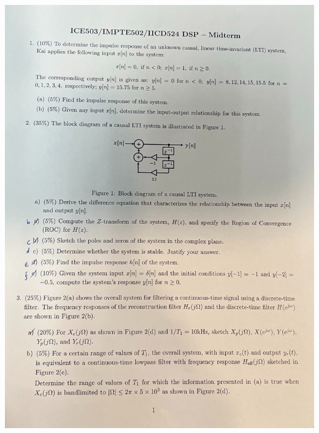 \documentclass[a4paper]{article}
\begin{document}
	\begin{center}
		\includegraphics[width=1.2\linewidth]{page1.jpeg}
	\end{center}
\end{document}
